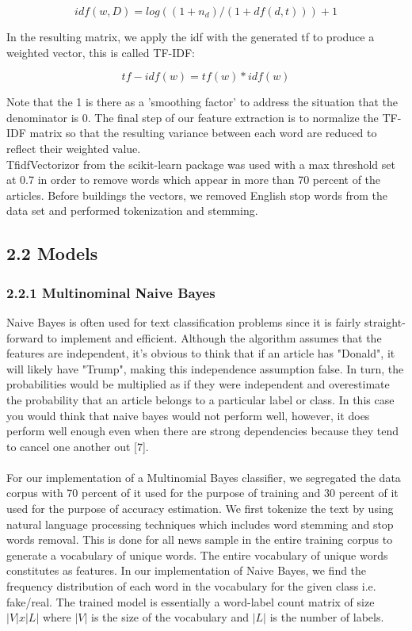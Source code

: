 \documentclass{neu_handout}
\begin{document}
$$idf(w,D)=log((1+n_d)/(1+df(d,t)))+1$$

In the resulting matrix, we apply the idf with the generated tf to produce a weighted vector, this is called TF-IDF:

$$tf-idf(w)=tf(w)*idf(w)$$

Note that the 1 is there as a 'smoothing factor' to address the situation that the denominator is 0. The final step of our feature extraction is to normalize the TF-IDF matrix so that the resulting variance between each word are reduced to reflect their weighted value.\\

TfidfVectorizor from the scikit-learn package was used with a max threshold set at 0.7 in order to remove words which appear in more than 70 percent of the articles. Before buildings the vectors, we removed English stop words from the data set and performed tokenization and stemming.

\subsection*{2.2 Models}



\subsubsection*{2.2.1 Multinominal Naive Bayes}

Naive Bayes is often used for text classification problems since it is  fairly straight-forward to implement and efficient. Although the algorithm assumes that the features are independent, it's obvious to think that if an article has "Donald", it will likely have "Trump", making this independence assumption false. In turn, the probabilities would be multiplied as if they were independent and overestimate the probability that an article belongs to a particular label or class. In this case you would think that naive bayes would not perform well, however, it does perform well enough even when there are strong dependencies because they tend to cancel one another out [7].\\\\

For our implementation of a Multinomial Bayes classifier, we segregated the data corpus with 70 percent of it used for the purpose of training and 30 percent of it used for the purpose of accuracy estimation. We first tokenize the text by using  natural language processing techniques which includes word stemming and stop words removal. This is done for all news sample in the entire training corpus to generate a vocabulary of unique words. The entire vocabulary of unique words constitutes as features. In our implementation of Naive Bayes, we find the frequency distribution of each word in the vocabulary for the given class i.e. fake/real. The trained model is essentially a word-label count matrix of size $|V| x |L|$ where $|V|$ is the size of the vocabulary and $|L|$ is the number of labels. \\\\
\end{document}
